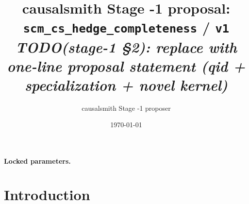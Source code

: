 \documentclass[11pt]{article}
\title{causalsmith Stage -1 proposal: \texttt{scm\_cs\_hedge\_completeness} / \texttt{v1}%
  \\ \large\textit{TODO(stage-1 \S2): replace with one-line proposal statement (qid + specialization + novel kernel)}}
\author{causalsmith Stage -1 proposer}
\date{\today}
\theoremstyle{definition}
\theoremstyle{plain}
\theoremstyle{remark}
\begin{document}
\maketitle


\paragraph{Locked parameters.}

\begin{abstract}
\end{abstract}

\section{Introduction}
%
%
%
%
\end{document}
